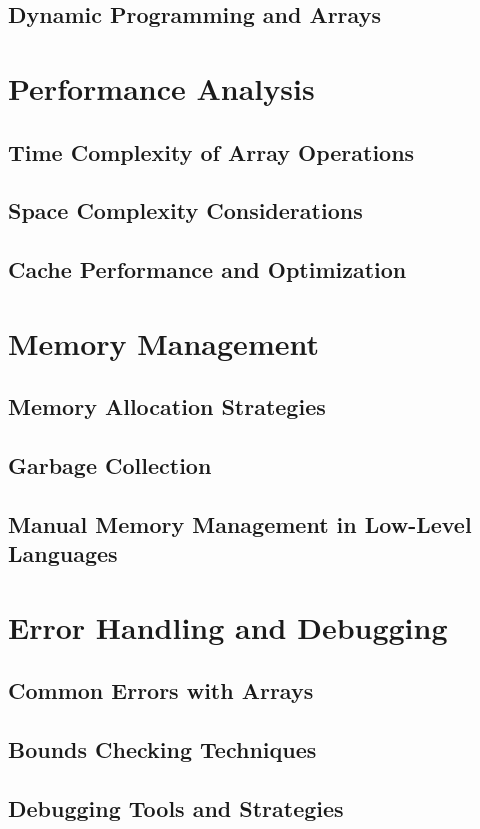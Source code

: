 \documentclass[12pt, oneside]{book}
\begin{document}
	\section{Dynamic Programming and Arrays}
	
	\chapter{Performance Analysis}
	\section{Time Complexity of Array Operations}
	\section{Space Complexity Considerations}
	\section{Cache Performance and Optimization}
	
	\chapter{Memory Management}
	\section{Memory Allocation Strategies}
	\section{Garbage Collection}
	\section{Manual Memory Management in Low-Level Languages}
	
	\chapter{Error Handling and Debugging}
	\section{Common Errors with Arrays}
	\section{Bounds Checking Techniques}
	\section{Debugging Tools and Strategies}
	
\end{document}
